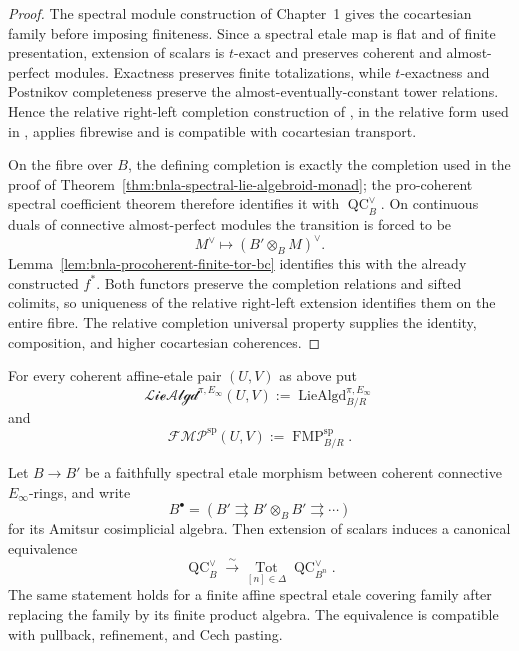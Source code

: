 \begin{proof}
The spectral module construction of Chapter~1 gives the cocartesian family
before imposing finiteness.  Since a spectral etale map is flat and of finite
presentation, extension of scalars is $t$-exact and preserves coherent and
almost-perfect modules.  Exactness preserves finite totalizations, while
$t$-exactness and Postnikov completeness preserve the
almost-eventually-constant tower relations.  Hence the relative right-left
completion construction of \cite{BrantnerCamposNuiten2025}, in the relative
form used in \cite{BrantnerMagidsonNuiten2025}, applies fibrewise and is
compatible with cocartesian transport.

On the fibre over $B$, the defining completion is exactly the completion used
in the proof of Theorem~\ref{thm:bnla-spectral-lie-algebroid-monad}; the
pro-coherent spectral coefficient theorem therefore identifies it with
$\operatorname{QC}^{\vee}_B$.  On continuous duals of connective
almost-perfect modules the transition is forced to be
\[
    M^\vee\longmapsto(B'\otimes_BM)^\vee.
\]
Lemma~\ref{lem:bnla-procoherent-finite-tor-bc} identifies this with the
already constructed $f^*$.  Both functors preserve the completion relations
and sifted colimits, so uniqueness of the relative right-left extension
identifies them on the entire fibre.  The relative completion universal
property supplies the identity, composition, and higher cocartesian
coherences.
\end{proof}

For every coherent affine-etale pair $(U,V)$ as above put
\[
    \mathscr{LieAlgd}^{\pi,E_\infty}(U,V)
    :=
    \operatorname{LieAlgd}^{\pi,E_\infty}_{B/R}
\]
and
\[
    \mathscr{FMP}^{\mathrm{sp}}(U,V)
    :=
    \operatorname{FMP}^{\mathrm{sp}}_{B/R}.
\]

\begin{proposition}
\label{prop:bnla-procoherent-etale-descent}
Let $B\to B'$ be a faithfully spectral etale morphism between coherent
connective $E_\infty$-rings, and write
\[
    B^\bullet
    =
    \left(
        B'
        \rightrightarrows
        B'\otimes_BB'
        \rightrightarrows\cdots
    \right)
\]
for its Amitsur cosimplicial algebra.  Then extension of scalars induces a
canonical equivalence
\[
\boxed{
    \operatorname{QC}^{\vee}_B
    \xrightarrow{\sim}
    \operatorname*{Tot}_{[n]\in\Delta}
    \operatorname{QC}^{\vee}_{B^n}.}
\]
The same statement holds for a finite affine spectral etale covering family
after replacing the family by its finite product algebra.  The equivalence is
compatible with pullback, refinement, and Cech pasting.
\end{proposition}

